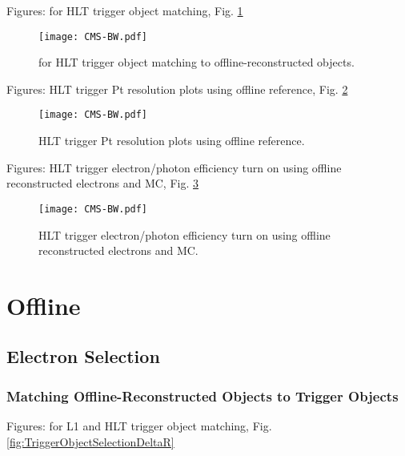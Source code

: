 Figures: \DR for HLT trigger object matching, Fig. \ref{fig:HLTriggerObjectDeltaR}

 \begin{figure}[htb]
  \begin{center}
    \texttt{[image: CMS-BW.pdf]}
  \end{center}
  \caption[\DR for HLT trigger object matching to offline]{\DR for HLT trigger object matching to offline-reconstructed objects.}
  \label{fig:HLTriggerObjectDeltaR}
 \end{figure}

Figures: HLT trigger Pt resolution plots using offline reference, Fig. \ref{fig:HLTriggerObjectResolutions}

 \begin{figure}[htb]
  \begin{center}
    \texttt{[image: CMS-BW.pdf]}
  \end{center}
  \caption[HLT trigger Pt resolution plots using offline reference]{HLT trigger Pt resolution plots using offline reference.}
  \label{fig:HLTriggerObjectResolutions}
 \end{figure}

Figures: HLT trigger electron/photon efficiency turn on using offline reconstructed electrons and MC, Fig. \ref{fig:HLTriggerObjectEfficiencies}

 \begin{figure}[htb]
  \begin{center}
    \texttt{[image: CMS-BW.pdf]}
  \end{center}
  \caption[HLT trigger electron/photon efficiency turn on using offline reconstructed electrons and MC]{HLT trigger electron/photon efficiency turn on using offline reconstructed electrons and MC.}
  \label{fig:HLTriggerObjectEfficiencies}
 \end{figure}




\section{Offline}
\subsection{Electron Selection}
\subsubsection{Matching Offline-Reconstructed Objects to Trigger Objects}
Figures: \DR for L1 and HLT trigger object matching, Fig. \ref{fig:TriggerObjectSelectionDeltaR}

